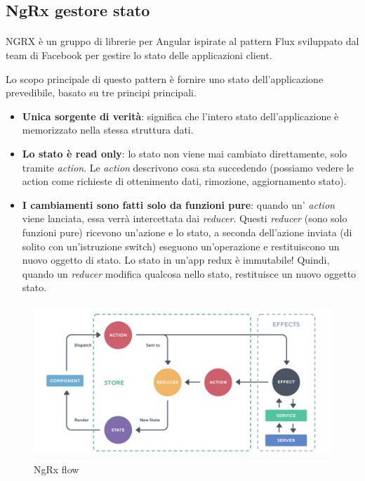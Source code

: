 \subsection{NgRx gestore stato}
\paragraph{}
NGRX è un gruppo di librerie per Angular ispirate al pattern Flux sviluppato dal team di Facebook per gestire
lo stato delle applicazioni client.

Lo scopo principale di questo pattern è fornire uno stato dell'applicazione prevedibile, basato su tre principi principali.

\begin{itemize}
    \item \textbf{Unica sorgente di verità}: significa che l'intero stato dell'applicazione è memorizzato nella
    stessa struttura dati.
    \item \textbf{Lo stato è read only}: lo stato non viene mai cambiato direttamente, 
    solo tramite \textit{action}. Le \textit{action} descrivono cosa sta succedendo (possiamo vedere le action
    come richieste di ottenimento dati, rimozione, aggiornamento stato).
    \item \textbf{I cambiamenti sono fatti solo da funzioni pure}: quando un' \textit{action} viene lanciata, essa verrà
    intercettata dai \textit{reducer}.
    Questi \textit{reducer} (sono solo funzioni pure) ricevono un'azione e lo stato, a seconda dell'azione inviata 
    (di solito con un'istruzione switch) eseguono un'operazione e restituiscono un nuovo oggetto di stato. 
    Lo stato in un'app redux è immutabile! Quindi, quando un \textit{reducer} modifica qualcosa nello stato, 
    restituisce un nuovo oggetto stato.
\end{itemize}

\paragraph{}
\begin{figure}[h!]
    \caption{NgRx flow}
    \includegraphics[scale=0.3]{img/cap2/ngrx}
\end{figure}
